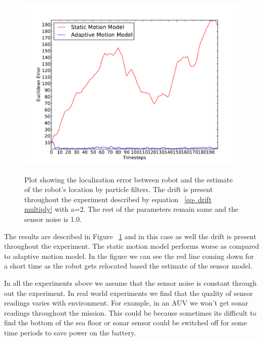 \documentclass[12pt]{dalcsthesis}
\begin{document}
\begin{figure}[!ht]
  \centering
     {\includegraphics[height = 3.0 in]{./plots/200_005_005_s_10_traj_3_drift_20_multiply.pdf}}
  \caption{\label{fig-drift_multiply} Plot showing the localization error between robot and the estimate of the robot's location by particle filters. The drift is present throughout the experiment described by equation ~\ref{eq- drift multiply} with a=2. The rest of the parameters remain same and the sensor noise is 1.0. }
\end{figure}

The results are described in Figure ~\ref{fig-drift_multiply} and in this case as well the drift is present throughout the experiment. The static motion model performs worse as compared to adaptive motion model. In the figure we can see the red line coming down for a short time as the robot gets relocated based the estimate of the sensor model.     


In all the experiments above we assume that the sensor noise is constant through out the experiment. In real world experiments we find that the quality of sensor readings varies with environment. For example, in an AUV we won't get sonar readings throughout the mission. This could be because sometimes its difficult to find the bottom of the sea floor or sonar sensor could be switched off for some time periods to save power on the battery.
\end{document}
